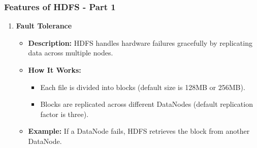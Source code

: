 \documentclass[aspectratio=169]{beamer}
\begin{document}
\begin{frame}[fragile]
    \frametitle{Features of HDFS - Part 1}
    \begin{enumerate}
        \item \textbf{Fault Tolerance}
        \begin{itemize}
            \item \textbf{Description:} HDFS handles hardware failures gracefully by replicating data across multiple nodes.
            \item \textbf{How It Works:}
                \begin{itemize}
                    \item Each file is divided into blocks (default size is 128MB or 256MB).
                    \item Blocks are replicated across different DataNodes (default replication factor is three).
                \end{itemize}
            \item \textbf{Example:} If a DataNode fails, HDFS retrieves the block from another DataNode.
        \end{itemize}
    \end{enumerate}
\end{frame}
\end{document}
